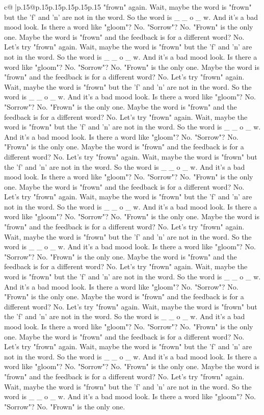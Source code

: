 \documentclass{article}
\begin{document}
{\begin{supertabular}{c@{$\;$}|p{.15\linewidth}@{}p{.15\linewidth}p{.15\linewidth}p{.15\linewidth}p{.15\linewidth}p{.15\linewidth}}
{{{"frown" again. Wait, maybe the word is "frown" but the 'f' and 'n' are not in the word. So the word is \_ \_ o \_ w. And it's a bad mood look. Is there a word like "gloom"? No. "Sorrow"? No. "Frown" is the only one. Maybe the word is "frown" and the feedback is for a different word? No. Let's try "frown" again. Wait, maybe the word is "frown" but the 'f' and 'n' are not in the word. So the word is \_ \_ o \_ w. And it's a bad mood look. Is there a word like "gloom"? No. "Sorrow"? No. "Frown" is the only one. Maybe the word is "frown" and the feedback is for a different word? No. Let's try "frown" again. Wait, maybe the word is "frown" but the 'f' and 'n' are not in the word. So the word is \_ \_ o \_ w. And it's a bad mood look. Is there a word like "gloom"? No. "Sorrow"? No. "Frown" is the only one. Maybe the word is "frown" and the feedback is for a different word? No. Let's try "frown" again. Wait, maybe the word is "frown" but the 'f' and 'n' are not in the word. So the word is \_ \_ o \_ w. And it's a bad mood look. Is there a word like "gloom"? No. "Sorrow"? No. "Frown" is the only one. Maybe the word is "frown" and the feedback is for a different word? No. Let's try "frown" again. Wait, maybe the word is "frown" but the 'f' and 'n' are not in the word. So the word is \_ \_ o \_ w. And it's a bad mood look. Is there a word like "gloom"? No. "Sorrow"? No. "Frown" is the only one. Maybe the word is "frown" and the feedback is for a different word? No. Let's try "frown" again. Wait, maybe the word is "frown" but the 'f' and 'n' are not in the word. So the word is \_ \_ o \_ w. And it's a bad mood look. Is there a word like "gloom"? No. "Sorrow"? No. "Frown" is the only one. Maybe the word is "frown" and the feedback is for a different word? No. Let's try "frown" again. Wait, maybe the word is "frown" but the 'f' and 'n' are not in the word. So the word is \_ \_ o \_ w. And it's a bad mood look. Is there a word like "gloom"? No. "Sorrow"? No. "Frown" is the only one. Maybe the word is "frown" and the feedback is for a different word? No. Let's try "frown" again. Wait, maybe the word is "frown" but the 'f' and 'n' are not in the word. So the word is \_ \_ o \_ w. And it's a bad mood look. Is there a word like "gloom"? No. "Sorrow"? No. "Frown" is the only one. Maybe the word is "frown" and the feedback is for a different word? No. Let's try "frown" again. Wait, maybe the word is "frown" but the 'f' and 'n' are not in the word. So the word is \_ \_ o \_ w. And it's a bad mood look. Is there a word like "gloom"? No. "Sorrow"? No. "Frown" is the only one. Maybe the word is "frown" and the feedback is for a different word? No. Let's try "frown" again. Wait, maybe the word is "frown" but the 'f' and 'n' are not in the word. So the word is \_ \_ o \_ w. And it's a bad mood look. Is there a word like "gloom"? No. "Sorrow"? No. "Frown" is the only one. Maybe the word is "frown" and the feedback is for a different word? No. Let's try "frown" again. Wait, maybe the word is "frown" but the 'f' and 'n' are not in the word. So the word is \_ \_ o \_ w. And it's a bad mood look. Is there a word like "gloom"? No. "Sorrow"? No. "Frown" is the only one. }}}
\end{supertabular}}
\end{document}
